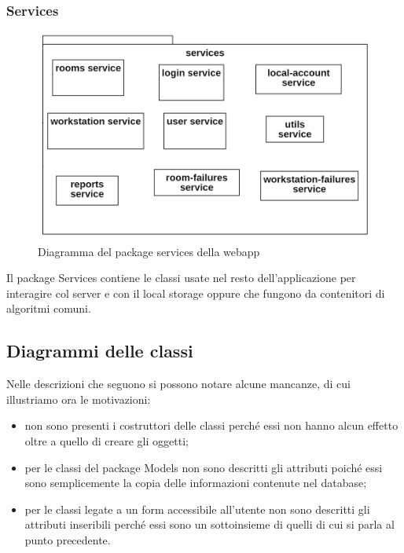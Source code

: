 \subsubsection{Services}
\begin{figure}[H]
	\centering
	\includegraphics[width=12cm]{res/images/webapp-services-diagrammaPackage.png}
	\caption{Diagramma del package services della webapp}
	\label{fig:DiagrammaPackageServicesWebapp}
\end{figure}
Il package Services contiene le classi usate nel resto dell'applicazione per interagire col server e con il local storage oppure che fungono da contenitori di algoritmi comuni.

\subsection{Diagrammi delle classi}
Nelle descrizioni che seguono si possono notare alcune mancanze, di cui illustriamo ora le motivazioni:
\begin{itemize}
	\item non sono presenti i costruttori delle classi perché essi non hanno alcun effetto oltre a quello di creare gli oggetti;
	\item per le classi del package Models non sono descritti gli attributi poiché essi sono semplicemente la copia delle informazioni contenute nel database;
	\item per le classi legate a un form accessibile all'utente non sono descritti gli attributi inseribili perché essi sono un sottoinsieme di quelli di cui si parla al punto precedente.
\end{itemize}

